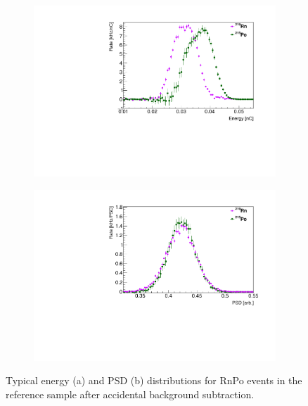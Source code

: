\begin{figure}[H]
	\centering
	\begin{subfigure}{0.5\linewidth}
		\centering
		\includegraphics[width=1.\linewidth]{"tex/6-ac227-images/BNL/RnPoEn_TimeBin23_S2"}
		\caption{}
	\end{subfigure}%
	\begin{subfigure}{0.5\linewidth}
		\centering
		\includegraphics[width=1.\linewidth]{"tex/6-ac227-images/BNL/RnPoPSD_TimeBin23_S2"}
		\caption{}
	\end{subfigure}
	\caption[Typical RnPo energy and PSD distributions]{Typical energy (a) and PSD (b) distributions for RnPo events in the reference sample after accidental background subtraction.}
	\label{fig:rnpoenpsd}
\end{figure}

